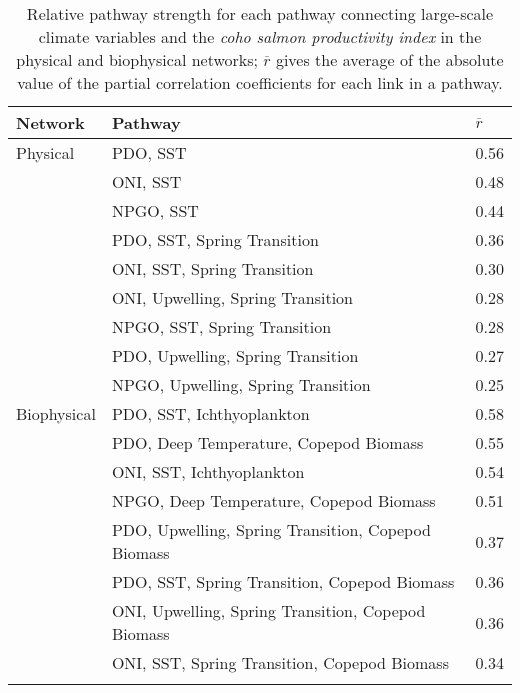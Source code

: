 {\small
\begin{longtable}{lll}
\caption[Relative pathway strength for each pathway connecting
         large-scale climate variables and the \emph{coho salmon productivity
         index}.]{Relative pathway strength for each pathway connecting
         large-scale climate variables and the \emph{coho salmon productivity
         index} in the physical and biophysical networks; $\overline{r}$ gives
         the average of the absolute value of the partial correlation
         coefficients for each link in a pathway.} \\ 
  \hline
Network & Pathway & $\overline{r}$ \\ 
  \hline
Physical & PDO, SST  & 0.56 \\ 
   & ONI, SST  & 0.48 \\ 
   & NPGO, SST  & 0.44 \\ 
   & PDO, SST, Spring Transition  & 0.36 \\ 
   & ONI, SST, Spring Transition  & 0.30 \\ 
   & ONI, Upwelling, Spring Transition  & 0.28 \\ 
   & NPGO, SST, Spring Transition  & 0.28 \\ 
   & PDO, Upwelling, Spring Transition  & 0.27 \\ 
   & NPGO, Upwelling, Spring Transition  & 0.25 \\ 
  Biophysical & PDO, SST, Ichthyoplankton  & 0.58 \\ 
   & PDO, Deep Temperature, Copepod Biomass  & 0.55 \\ 
   & ONI, SST, Ichthyoplankton  & 0.54 \\ 
   & NPGO, Deep Temperature, Copepod Biomass  & 0.51 \\ 
   & PDO, Upwelling, Spring Transition, Copepod Biomass  & 0.37 \\ 
   & PDO, SST, Spring Transition, Copepod Biomass  & 0.36 \\ 
   & ONI, Upwelling, Spring Transition, Copepod Biomass  & 0.36 \\ 
   & ONI, SST, Spring Transition, Copepod Biomass  & 0.34 \\ 
  \hline
\label{tab:bn:s1}
\end{longtable}
}
